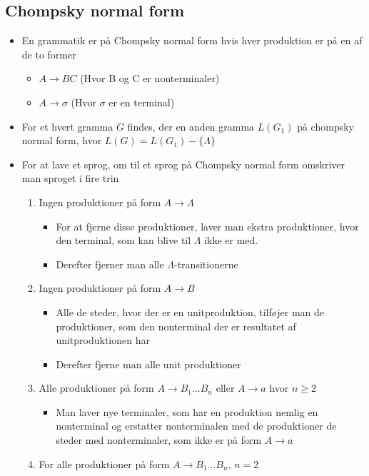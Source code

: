 \documentclass[a4, danish]{article}
\begin{document}
\subsection{Chompsky normal form}
\begin{itemize}
	\item En grammatik er på Chompsky normal form hvis hver produktion er på en af de to former
  \begin{itemize}
  	\item $A \rightarrow BC$ (Hvor B og C er nonterminaler)
    \item $A \rightarrow \sigma $ (Hvor $\sigma$ er en terminal)
  \end{itemize}
  \item For et hvert gramma $G$ findes, der en anden gramma $L(G_1)$ på chompsky normal form, hvor $L(G)=L(G_1)-\{\Lambda \}$
  \item For at lave et sprog, om til et sprog på Chompsky normal form omskriver man sproget i fire trin
  \begin{enumerate}
  	\item Ingen produktioner på form $A \rightarrow \Lambda$
    \begin{itemize}
    	\item For at fjerne disse produktioner, laver man ekstra produktioner, hvor den terminal, som kan blive til $\Lambda$ ikke er med.
      \item Derefter fjerner man alle $\Lambda$-transitionerne
    \end{itemize}
    \item Ingen produktioner på form $A \rightarrow B$
    \begin{itemize}
    	\item Alle de steder, hvor der er en unitproduktion, tilføjer man de produktioner, som den nonterminal der er resultatet af unitproduktionen har
      \item Derefter fjerne man alle unit produktioner
    \end{itemize}
    \item Alle produktioner på form $A \rightarrow B_1 ... B_n$ eller $A \rightarrow a$ hvor $n\geq 2$
    \begin{itemize}
    	\item Man laver nye terminaler, som har en produktion nemlig en nonterminal og erstatter nonterminalen med de produktioner de steder med nonterminaler, som ikke er på form $A \rightarrow a$
    \end{itemize}
    \item For alle produktioner på form $A \rightarrow B_1 ... B_n$, $n=2$

\end{enumerate}
\end{itemize}
\end{document}
